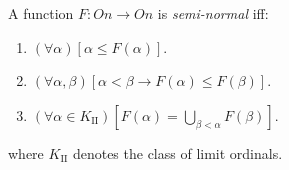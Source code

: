 A function $F: On \rightarrow On$ is \textit{semi-normal} iff:
\begin{enumerate}
\item $(\forall \alpha)[\alpha \leq F(\alpha)]$.
\item $(\forall \alpha, \beta)[\alpha < \beta \rightarrow F(\alpha) \leq F(\beta)]$.
\item $(\forall \alpha \in K_{\mathrm{II}})\left[ F(\alpha) = \bigcup_{\beta < \alpha} F(\beta) \right]$.
\end{enumerate}
where $K_{\mathrm{II}}$ denotes the class of limit ordinals.
